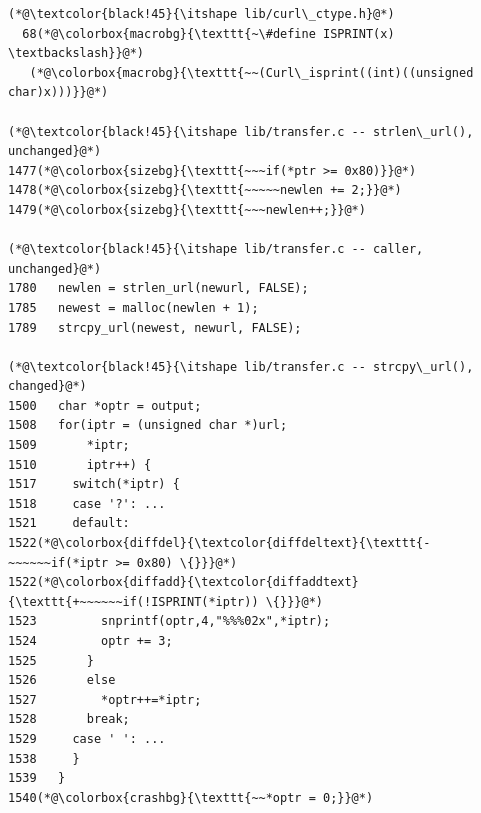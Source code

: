 \newcommand{\lno}[1]{{\tiny\sffamily\textcolor{black!50}{#1}}}
\newsavebox{\pdgcode}
\newlength{\pdgw}
\settowidth{\pdgw}{\ttfamily\scriptsize 123456789012345678901234567890123456789012345678}
\addtolength{\pdgw}{10pt}
 
\begin{lrbox}{\pdgcode}
\begin{minipage}{\pdgw}
\begin{lstlisting}[style=pdgfig]
(*@\textcolor{black!45}{\itshape lib/curl\_ctype.h}@*)
  68(*@\colorbox{macrobg}{\texttt{~\#define ISPRINT(x) \textbackslash}}@*)
   (*@\colorbox{macrobg}{\texttt{~~(Curl\_isprint((int)((unsigned char)x)))}}@*)
 
(*@\textcolor{black!45}{\itshape lib/transfer.c -- strlen\_url(), unchanged}@*)
1477(*@\colorbox{sizebg}{\texttt{~~~if(*ptr >= 0x80)}}@*)
1478(*@\colorbox{sizebg}{\texttt{~~~~~newlen += 2;}}@*)
1479(*@\colorbox{sizebg}{\texttt{~~~newlen++;}}@*)
 
(*@\textcolor{black!45}{\itshape lib/transfer.c -- caller, unchanged}@*)
1780   newlen = strlen_url(newurl, FALSE);
1785   newest = malloc(newlen + 1);
1789   strcpy_url(newest, newurl, FALSE);
 
(*@\textcolor{black!45}{\itshape lib/transfer.c -- strcpy\_url(), changed}@*)
1500   char *optr = output;
1508   for(iptr = (unsigned char *)url;
1509       *iptr;
1510       iptr++) {
1517     switch(*iptr) {
1518     case '?': ...
1521     default:
1522(*@\colorbox{diffdel}{\textcolor{diffdeltext}{\texttt{-~~~~~~if(*iptr >= 0x80) \{}}}@*)
1522(*@\colorbox{diffadd}{\textcolor{diffaddtext}{\texttt{+~~~~~~if(!ISPRINT(*iptr)) \{}}}@*)
1523         snprintf(optr,4,"%%%02x",*iptr);
1524         optr += 3;
1525       }
1526       else
1527         *optr++=*iptr;
1528       break;
1529     case ' ': ...
1538     }
1539   }
1540(*@\colorbox{crashbg}{\texttt{~~*optr = 0;}}@*)
\end{lstlisting}
\end{minipage}
\end{lrbox}
 

